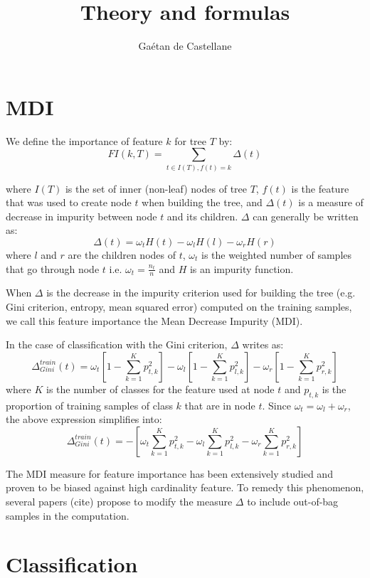 \documentclass{article}
\title{Theory and formulas}
\author{Gaétan de Castellane}
\begin{document}
\maketitle


\section{MDI}
We define the importance of feature $k$ for tree $T$ by:
\[
FI(k,T) = \sum_{t\in I(T), f(t)=k} \Delta(t)
\] 
 
where $I(T)$ is the set of inner (non-leaf) nodes of tree $T$, $f(t)$ is the feature that was used to create node $t$ when building the tree, and $\Delta(t)$ is a measure of decrease in impurity between node $t$ and its children. $\Delta$ can generally be written as:
\[
\Delta (t) = \omega_t H(t) - \omega_{l} H(l) - \omega_{r} H(r)
\] 
where $l$ and $r$ are the children nodes of $t$, $\omega_t$ is the weighted number of samples that go through node $t$ i.e. $\omega_t = \frac{n_t}{n}$ and $H$ is an impurity function.



When $\Delta$ is the decrease in the impurity criterion used for building the tree (e.g. Gini criterion, entropy, mean squared error) computed on the training samples, we call this feature importance the Mean Decrease Impurity (MDI).

In the case of classification with the Gini criterion, $\Delta$ writes as:
\[
\Delta_{Gini}^{train} (t) = \omega_t \left[1 - \sum_{k = 1}^K p_{t,k}^2\right] - \omega_{l} \left[1 - \sum_{k = 1}^K p_{l,k}^2\right] - \omega_{r} \left[1 - \sum_{k = 1}^K p_{r,k}^2\right]
\] 
where $K$ is the number of classes for the feature used at node $t$ and $p_{t,k}$ is the proportion of training samples of class $k$ that are in node $t$. Since $\omega_t = \omega_l + \omega_r$, the above expression simplifies into:
\[
\Delta_{Gini}^{train} (t) = - \left[\omega_t \sum_{k = 1}^K p_{t,k}^2 - \omega_{l} \sum_{k = 1}^K p_{l,k}^2 - \omega_{r} \sum_{k = 1}^K p_{r,k}^2\right]
\] 

The MDI measure for feature importance has been extensively studied and proven to be biased against high cardinality feature. To remedy this phenomenon, several papers (cite) propose to modify the measure $\Delta$ to include out-of-bag samples in the computation.

\section{Classification}
\end{document}
